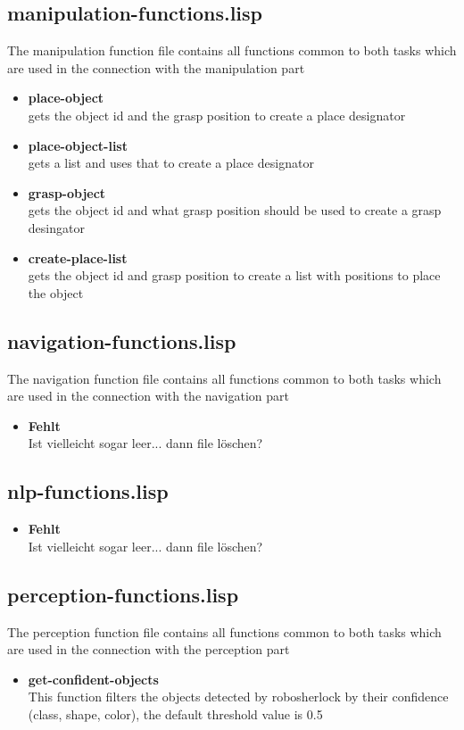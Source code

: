 \documentclass[main.tex]{subfiles}
\begin{document}
	    \subsection{manipulation-functions.lisp}
	    The manipulation function file contains all functions common to both tasks which are used in the connection with the manipulation part
	    \begin{itemize}
	    \item \textbf{place-object} \\
	    gets the object id and the grasp position to create a place designator  
		\item \textbf{place-object-list} \\
		gets a list and uses that to create a place designator 
	    \item \textbf{grasp-object} \\
	    gets the object id and what grasp position should be used to create a grasp desingator
	    \item \textbf{create-place-list} \\
	    gets the object id and grasp position to create a list with positions to place the object
		\end{itemize}
	    \subsection{navigation-functions.lisp}
	    The navigation function file contains all functions common to both tasks which are used in the connection with the navigation part
	    \begin{itemize}
	    	\item \textbf{Fehlt} \\
	    	Ist vielleicht sogar leer... dann file löschen?
	    \end{itemize}
	    \subsection{nlp-functions.lisp}
	    \begin{itemize}
	    	\item \textbf{Fehlt} \\
	    	Ist vielleicht sogar leer... dann file löschen?
	    \end{itemize}
	    \subsection{perception-functions.lisp}
	    The perception function file contains all functions common to both tasks which are used in the connection with the perception part
	    \begin{itemize}
	    	\item \textbf{get-confident-objects} \\
	    	This function filters the objects detected by robosherlock by their confidence (class, shape, color), the default threshold value is 0.5
	    \end{itemize}
\end{document}
